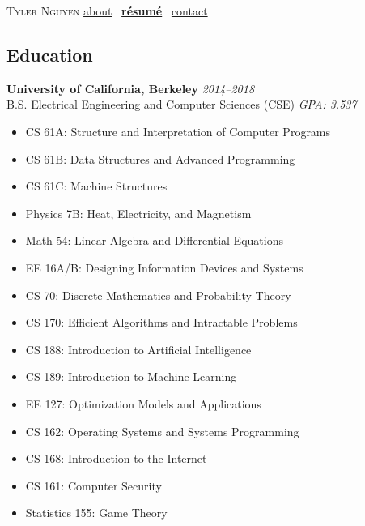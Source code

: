 \documentclass{article}
\begin{document}
\begin{preview}
\noindent \textsc{\Huge Tyler Nguyen} {\large\quad \href{about.pdf}{about} \ \href{resume.pdf}{\textbf{\textbullet r\'esum\'e}} \ \href{contact.pdf}{contact}}

\noindent\dotfill
\subsection*{Education}
\textbf{University of California, Berkeley} \hfill \textit{2014--2018}\\
B.S. Electrical Engineering and Computer Sciences (CSE) \hfill \textit{GPA: 3.537}
\begin{multicols}{2}
\begin{itemize}
\item CS 61A: Structure and Interpretation of Computer Programs
\item CS 61B: Data Structures and Advanced Programming
\item CS 61C: Machine Structures
\item Physics 7B: Heat, Electricity, and Magnetism
\item Math 54: Linear Algebra and Differential Equations
\item EE 16A/B: Designing Information Devices and Systems
\item CS 70: Discrete Mathematics and Probability Theory
\item CS 170: Efficient Algorithms and Intractable Problems
\item CS 188: Introduction to Artificial Intelligence
\item CS 189: Introduction to Machine Learning
\item EE 127: Optimization Models and Applications
\item CS 162: Operating Systems and Systems Programming
\item CS 168: Introduction to the Internet
\item CS 161: Computer Security
\item Statistics 155: Game Theory
\end{itemize}
\end{multicols}

\end{preview}
\end{document}
